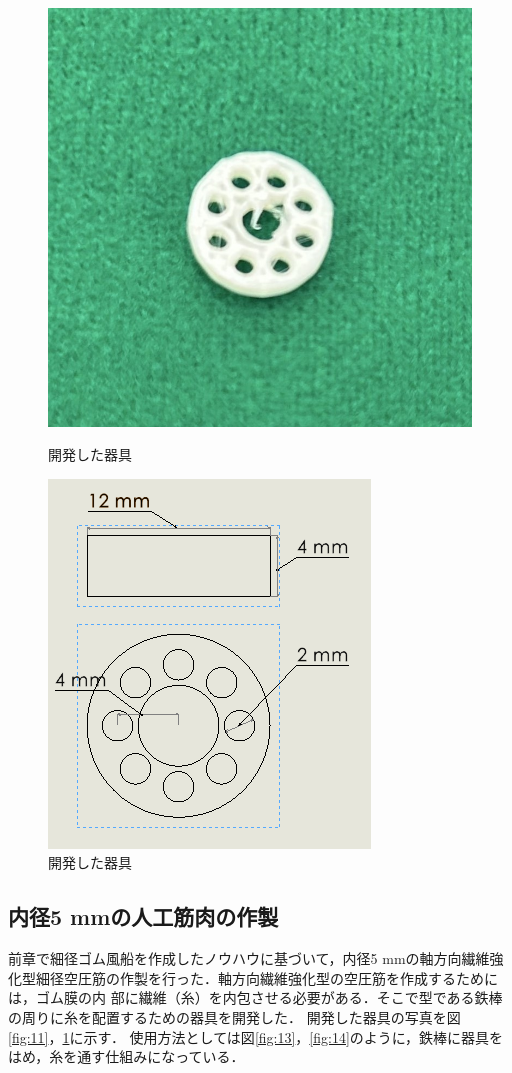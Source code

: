 \begin{figure}[h]
\begin{minipage}[b]{0.33\hsize}
      \centering
      \includegraphics[scale=0.25]{pic/kigu2.jpg}
      \caption{開発した器具}
      \label{fig:11}
  \end{minipage} 
  \begin{minipage}[b]{0.33\hsize}
      \centering
      \includegraphics[scale=0.4]{pic/5mm.PNG}
      \caption{開発した器具}
      \label{fig:12}
  \end{minipage} 
\end{figure}
\newpage
\subsection{内径5 mmの人工筋肉の作製}
前章で細径ゴム風船を作成したノウハウに基づいて，内径5 mmの軸方向繊維強化型細径空圧筋の作製を行った．軸方向繊維強化型の空圧筋を作成するためには，ゴム膜の内
部に繊維（糸）を内包させる必要がある．そこで型である鉄棒の周りに糸を配置するための器具を開発した．
開発した器具の写真を図\ref{fig:11}，\ref{fig:12}に示す．
使用方法としては図\ref{fig:13}，\ref{fig:14}のように，鉄棒に器具をはめ，糸を通す仕組みになっている．

